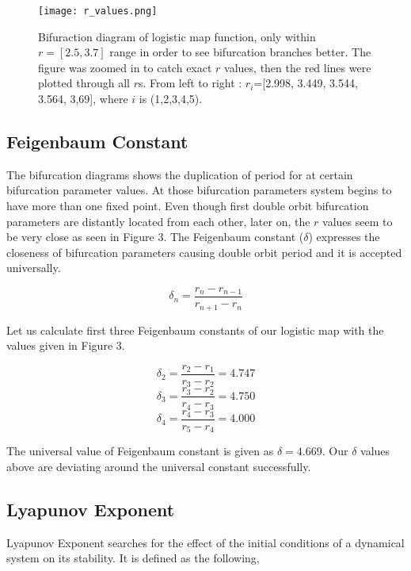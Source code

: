 \documentclass[12pt]{article}
\begin{document}
\begin{figure}[h!]
	\centering
	\texttt{[image: r\_values.png]}
		\caption{Bifuraction diagram of logistic map function, only within $r=[2.5,3.7]$ range in order to see bifurcation branches better. The figure was zoomed in to catch exact $r$ values, then the red lines were plotted through all $r$s. From left to right :  $r_i$=[2.998, 3.449, 3.544, 3.564, 3,69], where $i$ is (1,2,3,4,5).  }
\end{figure}  

\subsection{Feigenbaum Constant}   

The bifurcation diagrams shows the duplication of period for at certain bifurcation parameter values. At those bifurcation parameters system begins to have more than one fixed point. Even though first double orbit bifurcation parameters are distantly located from each other, later on, the $r$ values seem to be very close as seen in Figure 3. The Feigenbaum constant ($\delta$) expresses the closeness of bifurcation parameters causing double orbit period and it is accepted universally. 
   
\begin{equation}
\delta_n = \dfrac{r_n - r_{n-1}}{r_{n+1}-r_n}
\end{equation}   

Let us calculate first three Feigenbaum constants of our logistic map with the values given in Figure 3.

\begin{equation*}
\delta_2 = \dfrac{r_2 - r_{1}}{r_{3}-r_2} = 4.747
\end{equation*} 
\begin{equation*}
\delta_3 = \dfrac{r_3 - r_{2}}{r_{4}-r_3} = 4.750
\end{equation*} 
\begin{equation*}
\delta_4 = \dfrac{r_4 - r_{3}}{r_{5}-r_4} = 4.000
\end{equation*} 

The universal value of Feigenbaum constant is given as $\delta =4.669$. Our $\delta$ values above are deviating around the universal constant successfully.

 
\subsection{Lyapunov Exponent} 
Lyapunov Exponent searches for the effect of the initial conditions of a dynamical system on its stability. It is defined as the following,
\end{document}
